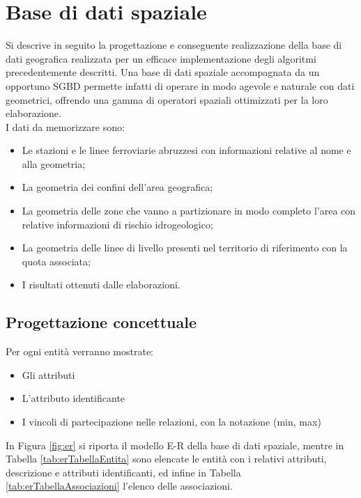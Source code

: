 \section{Base di dati spaziale}
Si descrive in seguito la progettazione e conseguente realizzazione della base di dati geografica realizzata per un efficace implementazione degli algoritmi precedentemente descritti. Una base di dati spaziale accompagnata da un opportuno SGBD permette infatti di operare in modo agevole e naturale con dati geometrici, offrendo una gamma di operatori spaziali ottimizzati per la loro elaborazione. \\
I dati da memorizzare sono: 
\begin{itemize}
\item Le stazioni e le linee ferroviarie abruzzesi con informazioni relative al nome e alla geometria;
\item La geometria dei confini dell'area geografica;
\item La geometria delle zone che vanno a partizionare in modo completo l'area con relative informazioni di rischio idrogeologico;
\item La geometria delle linee di livello presenti nel territorio di riferimento con la quota associata;
\item I risultati ottenuti dalle elaborazioni.
\end{itemize}

 

\subsection{Progettazione concettuale}
Per ogni entità verranno mostrate:

\begin{itemize}
\item Gli attributi
\item L'attributo identificante
\item I vincoli di partecipazione nelle relazioni, con la notazione (min, max)
\end{itemize}

In Figura \ref{fig:er} si riporta il modello E-R della base di dati spaziale, mentre in Tabella \ref{tab:erTabellaEntita} sono elencate le entità con i relativi attributi, descrizione e attributi identificanti, ed infine in Tabella \ref{tab:erTabellaAssociazioni} l’elenco delle associazioni.
\pagebreak

